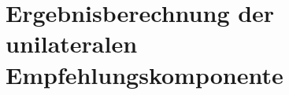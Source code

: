 \section{Ergebnisberechnung der unilateralen Empfehlungskomponente}
\label{ch:nebenrechnungen:unilateral}
